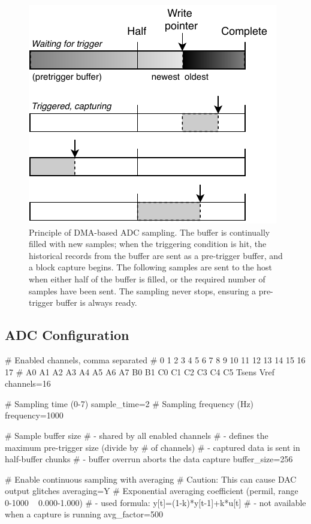 \begin{figure}[h]
	\centering
	\includegraphics[scale=1]{img/adc-dma-buf.pdf}
	\caption{\label{fig:adc_dma}Principle of DMA-based ADC sampling. The buffer is continually filled with new samples; when the triggering condition is hit, the historical records from the buffer are sent as a pre-trigger buffer, and a block capture begins. The following samples are sent to the host when either half of the buffer is filled, or the required number of samples have been sent. The sampling never stops, ensuring a pre-trigger buffer is always ready.}
\end{figure}

\subsection{ADC Configuration}

\begin{inicode}
# Enabled channels, comma separated
#  0  1  2  3  4  5  6  7    8  9   10 11 12 13 14 15   16    17
# A0 A1 A2 A3 A4 A5 A6 A7   B0 B1   C0 C1 C2 C3 C4 C5   Tsens Vref
channels=16

# Sampling time (0-7)
sample_time=2
# Sampling frequency (Hz)
frequency=1000

# Sample buffer size
# - shared by all enabled channels
# - defines the maximum pre-trigger size (divide by # of channels)
# - captured data is sent in half-buffer chunks
# - buffer overrun aborts the data capture
buffer_size=256

# Enable continuous sampling with averaging
# Caution: This can cause DAC output glitches
averaging=Y
# Exponential averaging coefficient (permil, range 0-1000 ~ 0.000-1.000)
# - used formula: y[t]=(1-k)*y[t-1]+k*u[t]
# - not available when a capture is running
avg_factor=500
\end{inicode}

